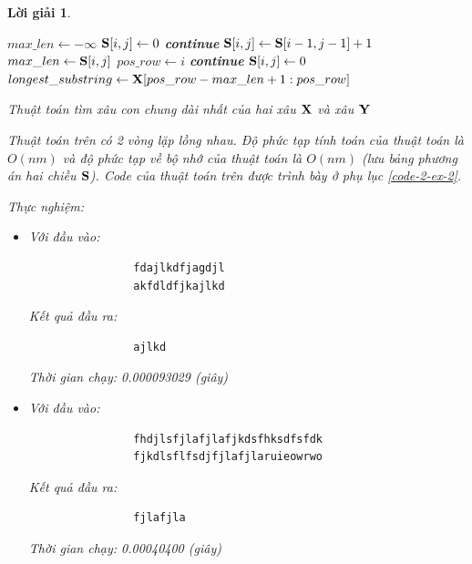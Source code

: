 \documentclass[14pt, a4paper]{article}
\theoremstyle{sltheorem}
\theoremstyle{soltheorem}
\newtheorem*{loigiai}{Lời giải}
\begin{document}
\begin{loigiai}
\begin{itemize} [label={$-$}]
\begin{algorithm}
            $max\_len \gets - \infty$\;
             {
                 {
                     {
                        $\bold{S} \lbrack i, j \rbrack \gets 0$\;
                        \textbf{continue}\;
                    }
                     {
                        $\bold{S} \lbrack i, j \rbrack \gets \bold{S} \lbrack i - 1, j - 1 \rbrack + 1$\;
                         {
                            $max\_len \gets \bold{S} \lbrack i, j \rbrack$\;
                            $pos\_row \gets i$\;
                        }
                        \textbf{continue}\;
                    }
                     {
                        $\bold{S} \lbrack i, j \rbrack \gets 0$\;
                    }
                }
            }
            $longest\_substring \gets \bold{X} \lbrack pos\_row - max\_len + 1: pos\_row \rbrack$\;
            \;
            \caption{Thuật toán tìm xâu con chung dài nhất của hai xâu $\bold{X}$ và xâu $\bold{Y}$}
        \end{algorithm}

        Thuật toán trên có 2 vòng lặp lồng nhau.
        Độ phức tạp tính toán của thuật toán là $O(nm)$ và độ phức tạp về bộ nhớ của thuật toán là $O(nm)$ (lưu bảng phương án hai chiều $\bold{S}$).
        Code của thuật toán trên được trình bày ở phụ lục \ref{code-2-ex-2}.

        Thực nghiệm:

        \begin{itemize}
            \item Với đầu vào:
            \begin{verbatim}
                fdajlkdfjagdjl
                akfdldfjkajlkd
            \end{verbatim}
            Kết quả đầu ra:
            \begin{verbatim}
                ajlkd
            \end{verbatim}
            Thời gian chạy: 0.000093029 (giây)
            \item Với đầu vào:
            \begin{verbatim}
                fhdjlsfjlafjlafjkdsfhksdfsfdk  
                fjkdlsflfsdjfjlafjlaruieowrwo
            \end{verbatim}
            Kết quả đầu ra:
            \begin{verbatim}
                fjlafjla
            \end{verbatim}
            Thời gian chạy: 0.00040400 (giây)
        \end{itemize}


\end{itemize}
\end{loigiai}
\end{document}
